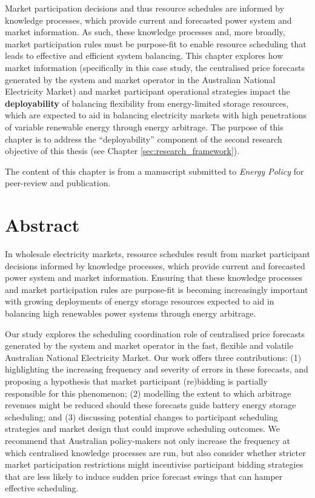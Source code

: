 \documentclass[12pt,a4paper,]{report}
\begin{document}
Market participation decisions and thus resource schedules are informed
by knowledge processes, which provide current and forecasted power
system and market information. As such, these knowledge processes and,
more broadly, market participation rules must be purpose-fit to enable
resource scheduling that leads to effective and efficient system
balancing. This chapter explores how market information (specifically in
this case study, the centralised price forecasts generated by the system
and market operator in the Australian National Electricity Market) and
market participant operational strategies impact the
\textbf{deployability} of balancing flexibility from energy-limited
storage resources, which are expected to aid in balancing electricity
markets with high penetrations of variable renewable energy through
energy arbitrage. The purpose of this chapter is to address the
``deployability'' component of the second research objective of this
thesis (see Chapter \ref{sec:research_framework}).

The content of this chapter is from a manuscript submitted to
\emph{Energy Policy} for peer-review and publication.

\hypertarget{abstract-3}{%
\section{Abstract}\label{abstract-3}}

In wholesale electricity markets, resource schedules result from market
participant decisions informed by knowledge processes, which provide
current and forecasted power system and market information. Ensuring
that these knowledge processes and market participation rules are
purpose-fit is becoming increasingly important with growing deployments
of energy storage resources expected to aid in balancing high renewables
power systems through energy arbitrage.

Our study explores the scheduling coordination role of centralised price
forecasts generated by the system and market operator in the fast,
flexible and volatile Australian National Electricity Market. Our work
offers three contributions: (1) highlighting the increasing frequency
and severity of errors in these forecasts, and proposing a hypothesis
that market participant (re)bidding is partially responsible for this
phenomenon; (2) modelling the extent to which arbitrage revenues might
be reduced should these forecasts guide battery energy storage
scheduling; and (3) discussing potential changes to participant
scheduling strategies and market design that could improve scheduling
outcomes. We recommend that Australian policy-makers not only increase
the frequency at which centralised knowledge processes are run, but also
consider whether stricter market participation restrictions might
incentivise participant bidding strategies that are less likely to
induce sudden price forecast swings that can hamper effective
scheduling.
\end{document}
